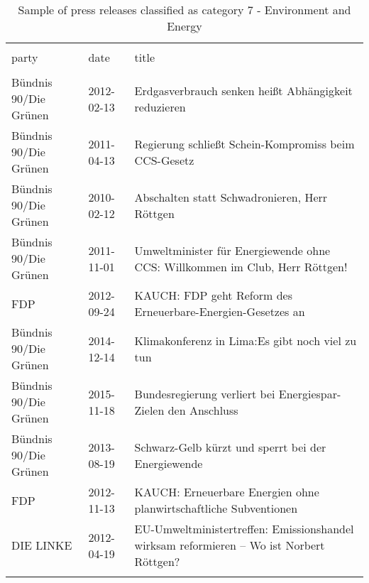 
\begin{table}[!htbp] \centering 
  \caption{Sample of press releases classified as category 7 - Environment and Energy} 
  \label{tab:7-document-samples} 
\begin{tabularx}{\textwidth}{XXX} 
\\[-1.8ex]\hline 
\hline \\[-1.8ex] 
party & date & title \\ 
\hline \\[-1.8ex] 
Bündnis 90/Die Grünen & 2012-02-13 & Erdgasverbrauch senken heißt Abhängigkeit reduzieren \\ 
Bündnis 90/Die Grünen & 2011-04-13 & Regierung schließt Schein-Kompromiss beim CCS-Gesetz \\ 
Bündnis 90/Die Grünen & 2010-02-12 & Abschalten statt Schwadronieren, Herr Röttgen \\ 
Bündnis 90/Die Grünen & 2011-11-01 & Umweltminister für Energiewende ohne CCS: Willkommen im Club, Herr Röttgen! \\ 
FDP & 2012-09-24 & KAUCH: FDP geht Reform des Erneuerbare-Energien-Gesetzes an \\ 
Bündnis 90/Die Grünen & 2014-12-14 & Klimakonferenz in Lima:Es gibt noch viel zu tun \\ 
Bündnis 90/Die Grünen & 2015-11-18 & Bundesregierung verliert bei Energiespar-Zielen den Anschluss \\ 
Bündnis 90/Die Grünen & 2013-08-19 & Schwarz-Gelb kürzt und sperrt bei der Energiewende \\ 
FDP & 2012-11-13 & KAUCH: Erneuerbare Energien ohne planwirtschaftliche Subventionen \\ 
DIE LINKE & 2012-04-19 & EU-Umweltministertreffen: Emissionshandel wirksam reformieren – Wo ist Norbert Röttgen? \\ 
\hline \\[-1.8ex] 
\end{tabularx} 
\end{table} 

